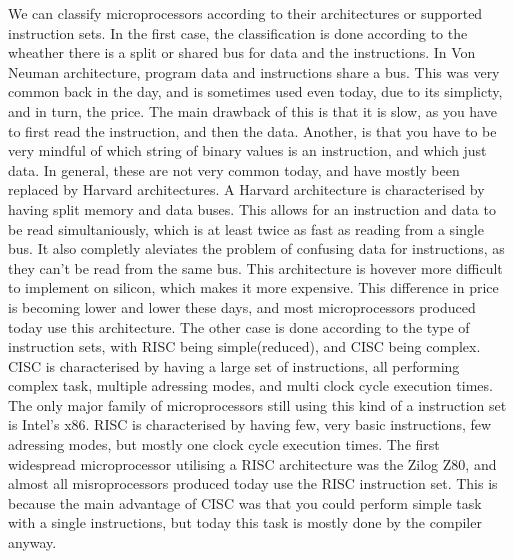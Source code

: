 \sol We can classify microprocessors according to their architectures or supported instruction sets.
    In the first case, the classification is done according to the wheather there is a split or shared
    bus for data and the instructions. In Von Neuman architecture, program data and instructions share 
    a bus. This was very common back in the day, and is sometimes used even today, due to its simplicty,
    and in turn, the price. The main drawback of this is that it is slow, as you have to first read the 
    instruction, and then the data. Another, is that you have to be very mindful of which string of
    binary values is an instruction, and which just data. In general, these are not very common today,
    and have mostly been replaced by Harvard architectures. A Harvard architecture is characterised
    by having split memory and data buses. This allows for an instruction and data to be read simultaniously,
    which is at least twice as fast as reading from a single bus. It also completly aleviates the problem
    of confusing data for instructions, as they can't be read from the same bus. This architecture is 
    hovever more difficult to implement on silicon, which makes it more expensive. This difference in price
    is becoming lower and lower these days, and most microprocessors produced today use this architecture.
    The other case is done according to the type of instruction sets, with RISC being simple(reduced), and
    CISC being complex. CISC is characterised by having a large set of instructions, all performing complex
    task, multiple adressing modes, and multi clock cycle execution times. The only major family of microprocessors
    still using this kind of a instruction set is Intel's x86.
    RISC is characterised by having few, very basic instructions, few adressing modes, but mostly one clock cycle
    execution times. The first widespread microprocessor utilising a RISC architecture was the Zilog Z80, and
    almost all misroprocessors produced today use the RISC instruction set. This is because the main advantage of
    CISC was that you could perform simple task with a single instructions, but today this task is mostly
    done by the compiler anyway. 


